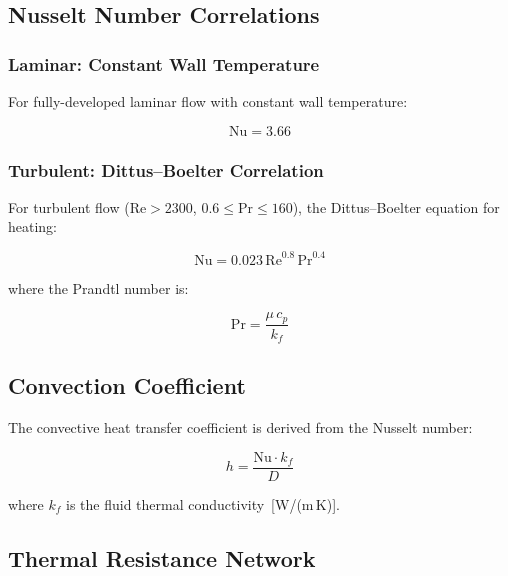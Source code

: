 \documentclass[11pt]{article}
\begin{document}
\subsection{Nusselt Number Correlations}

\subsubsection{Laminar: Constant Wall Temperature}

For fully-developed laminar flow with constant wall temperature:

\begin{equation}
  \mathrm{Nu} = 3.66
  \label{eq:nu-laminar}
\end{equation}

\subsubsection{Turbulent: Dittus--Boelter Correlation}

For turbulent flow ($\mathrm{Re} > 2300$, $0.6 \leq \mathrm{Pr} \leq 160$),
the Dittus--Boelter equation for heating:

\begin{equation}
  \mathrm{Nu} = 0.023 \, \mathrm{Re}^{0.8} \, \mathrm{Pr}^{0.4}
  \label{eq:dittus-boelter}
\end{equation}

where the Prandtl number is:

\begin{equation}
  \mathrm{Pr} = \frac{\mu \, c_p}{k_f}
  \label{eq:prandtl}
\end{equation}

\subsection{Convection Coefficient}

The convective heat transfer coefficient is derived from the Nusselt number:

\begin{equation}
  h = \frac{\mathrm{Nu} \cdot k_f}{D}
  \label{eq:h-conv}
\end{equation}

where $k_f$ is the fluid thermal conductivity~[W/(m\,K)].

\subsection{Thermal Resistance Network}
\end{document}
